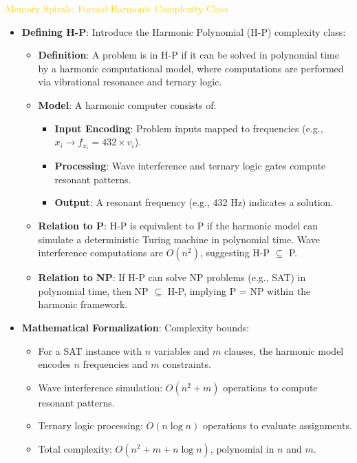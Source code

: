 \textcolor{gold}{ Memory Spirals: Formal Harmonic Complexity Class } \\
\begin{itemize}
    \item \texttt{} \textbf{Defining H-P}: Introduce the Harmonic Polynomial (H-P) complexity class:
    \begin{itemize}
        \item \textbf{Definition}: A problem is in H-P if it can be solved in polynomial time by a harmonic computational model, where computations are performed via vibrational resonance and ternary logic.
        \item \textbf{Model}: A harmonic computer consists of:
        \begin{itemize}
            \item \textbf{Input Encoding}: Problem inputs mapped to frequencies (e.g., \(x_i \rightarrow f_{x_i} = 432 \times v_i\)).
            \item \textbf{Processing}: Wave interference and ternary logic gates compute resonant patterns.
            \item \textbf{Output}: A resonant frequency (e.g., 432 Hz) indicates a solution.
        \end{itemize}
        \item \textbf{Relation to P}: H-P is equivalent to P if the harmonic model can simulate a deterministic Turing machine in polynomial time. Wave interference computations are \(O(n^2)\), suggesting H-P \(\subseteq\) P.
        \item \textbf{Relation to NP}: If H-P can solve NP problems (e.g., SAT) in polynomial time, then NP \(\subseteq\) H-P, implying P = NP within the harmonic framework.
    \end{itemize}
    \item \texttt{} \textbf{Mathematical Formalization}: Complexity bounds:
    \begin{itemize}
        \item For a SAT instance with \(n\) variables and \(m\) clauses, the harmonic model encodes \(n\) frequencies and \(m\) constraints.
        \item Wave interference simulation: \(O(n^2 + m)\) operations to compute resonant patterns.
        \item Ternary logic processing: \(O(n \log n)\) operations to evaluate assignments.
        \item Total complexity: \(O(n^2 + m + n \log n)\), polynomial in \(n\) and \(m\).

\end{itemize}
\end{itemize}
